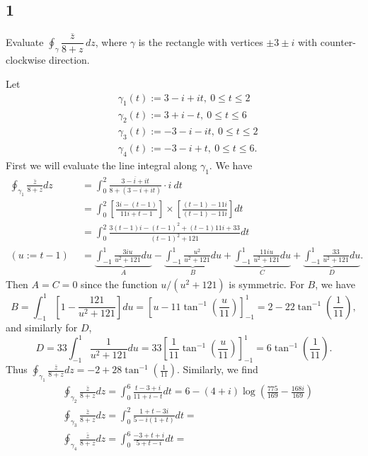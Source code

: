 \documentclass[12pt]{article}
\begin{document}
\subsection*{1}
\begin{tcolorbox}
Evaluate
$\oint_\gamma \dfrac{\overline{z}}{8+z}\,dz$, where $\gamma$ is the
rectangle with vertices $\pm 3\pm i$ with counter-clockwise
direction.
\end{tcolorbox}
Let 
\begin{align*}
& \gamma_{1}(t) := 3 - i + it, \ 0 \leq t \leq 2 \\
& \gamma_{2}(t) := 3 + i - t,  \ 0 \leq t \leq 6 \\
& \gamma_{3}(t) := -3 - i - it, \ 0 \leq t \leq 2 \\
& \gamma_{4}(t) := -3 - i + t, \ 0 \leq t \leq 6.
\end{align*}
First we will evaluate the line integral along $\gamma_{1}$. We have 
\begin{align*}
\oint_{\gamma_{1}}\frac{\bar{z}}{8 + z}dz & = \int_{0}^{2}\frac{\overline{3 - i + it}}{8 + (3-i + it)}\cdot i\  dt \\
& = \int_{0}^{2} 
\left[ \frac{3i - (t-1)}{11i + t - 1}\right]\times \left[ \frac{(t-1) - 11i}{(t-1) - 11i}\right]dt \\
& = \int_{0}^{2}\frac{3(t-1)i - (t-1)^2 + (t-1)11i + 33 }{(t-1)^{2} + 121}dt \\
(u:= t - 1)\  \ & = \underbrace{\int_{-1}^{1}\frac{3iu}{u^{2} + 121}du}_{A} - \underbrace{\int_{-1}^{1}\frac{u^{2}}{u^{2} + 121}du}_{B} + 
\underbrace{\int_{-1}^{1}\frac{11iu}{u^{2}+121}du}_{C} +
\underbrace{\int_{-1}^{1}\frac{33}{u^{2} + 121}du}_{D}.
\end{align*}
Then $A = C = 0$ since the function $u / (u^{2} + 121)$ is symmetric. For $B$, we have 
\[ B = \int_{-1}^{1}\left[ 1 - \frac{121}{u^{2} + 121}\right]du = \left[ u - 11\tan^{-1}\left( \frac{u}{11} \right)\right]_{-1}^{1}  = 2 -
22\tan^{-1}\left( \frac{1}{11} \right), \]
and similarly for $D$,
\[ D = 33 \int_{-1}^{1}\frac{1}{u^{2} + 121}du = 33\left[ \frac{1}{11}\tan^{-1}\left( \frac{u}{11} \right)\right]_{-1}^{1} = 6\tan^{-1}\left( 
\frac{1}{11}\right). \]
Thus $\oint_{\gamma_{1}}\frac{\bar{z}}{8 + z}dz = -2 + 28\tan^{-1}\left( \frac{1}{11} \right)$. Similarly, we find 
\begin{align*}
& \oint_{\gamma_{2}}\frac{\bar{z}}{8 + z}dz = \int_{0}^{6}\frac{t - 3 + i}{11 + i - t}dt = 6 - (4 + i)\log\left( \frac{775}{169} - \frac{168i}{169} \right)\\
& \oint_{\gamma_{3}}\frac{\bar{z}}{8 + z}dz = \int_{0}^{2}\frac{1 + t - 3i}{5 - i(1 + t)}dt =    \\
& \oint_{\gamma_{4}}\frac{\bar{z}}{8 + z}dz = \int_{0}^{6}\frac{-3 + t + i}{5 + t - i}dt =    \\
\end{align*}
\end{document}
